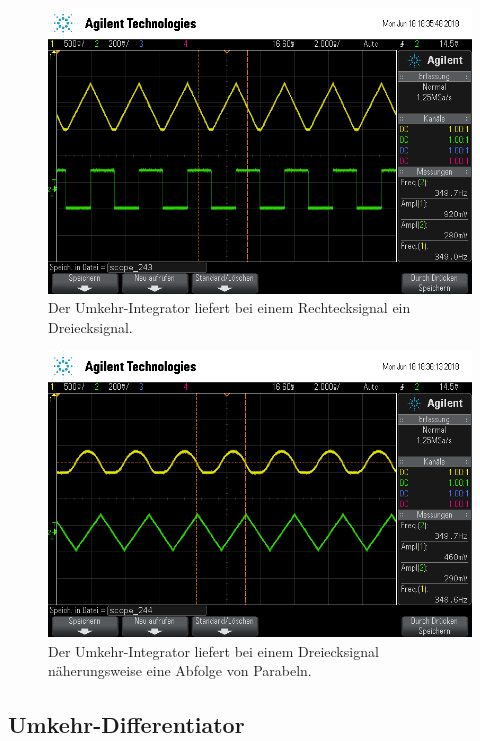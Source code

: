 \begin{figure}[h]
	\centering
	\includegraphics[width=\textwidth]{usb/scope_243.png}
	\caption{Der Umkehr-Integrator liefert bei einem Rechtecksignal ein Dreiecksignal.}
	\label{scope_243}
\end{figure}
\begin{figure}[h]
	\centering
	\includegraphics[width=\textwidth]{usb/scope_244.png}
	\caption{Der Umkehr-Integrator liefert bei einem Dreiecksignal näherungsweise eine Abfolge von Parabeln.}
	\label{scope_244}
\end{figure}

\FloatBarrier

\subsection{Umkehr-Differentiator}

